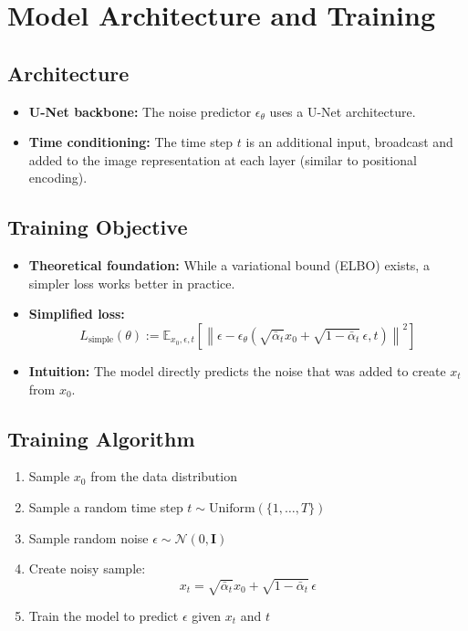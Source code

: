 \section{Model Architecture and Training}

\subsection*{Architecture}
\begin{itemize}
    \item \textbf{U-Net backbone:} The noise predictor $\epsilon_\theta$ uses a U-Net architecture.
    \item \textbf{Time conditioning:} The time step $t$ is an additional input, broadcast and added to the image representation at each layer (similar to positional encoding).
\end{itemize}

\subsection*{Training Objective}
\begin{itemize}
    \item \textbf{Theoretical foundation:} While a variational bound (ELBO) exists, a simpler loss works better in practice.
    \item \textbf{Simplified loss:}
    \[
    L_{\text{simple}}(\theta) := \mathbb{E}_{x_0, \epsilon, t} \left[\left\| \epsilon - \epsilon_\theta\left(\sqrt{\bar{\alpha}_t}x_0 + \sqrt{1 - \bar{\alpha}_t} \, \epsilon, t\right) \right\|^2\right]
    \]
    \item \textbf{Intuition:} The model directly predicts the noise that was added to create $x_t$ from $x_0$.
\end{itemize}

\subsection*{Training Algorithm}
\begin{enumerate}
    \item Sample $x_0$ from the data distribution
    \item Sample a random time step $t \sim \text{Uniform}(\{1, \ldots, T\})$
    \item Sample random noise $\epsilon \sim \mathcal{N}(0, \mathbf{I})$
    \item Create noisy sample: \[
    x_t = \sqrt{\bar{\alpha}_t} x_0 + \sqrt{1 - \bar{\alpha}_t} \, \epsilon
    \]
    \item Train the model to predict $\epsilon$ given $x_t$ and $t$
\end{enumerate}

